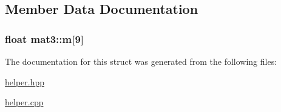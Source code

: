 \subsection{Member Data Documentation}
\hypertarget{structmat3_af5c67cec8668816c844bfd3f097f9eb2}{
\subsubsection[{m}]{\setlength{\rightskip}{0pt plus 5cm}float mat3\+::m\mbox{[}9\mbox{]}}}\label{structmat3_af5c67cec8668816c844bfd3f097f9eb2}


The documentation for this struct was generated from the following files\+:\begin{DoxyCompactItemize}
\item 
\hyperlink{helper_8hpp}{helper.\+hpp}\item 
\hyperlink{helper_8cpp}{helper.\+cpp}\end{DoxyCompactItemize}
